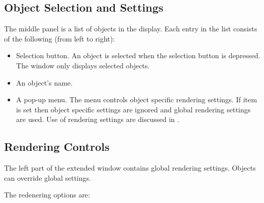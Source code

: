 \subsection{Object Selection and Settings}

The middle panel is a list of objects in the display.  Each entry in
the list consists of the following (from left to right):

\begin{itemize}
\item Selection button.  An object is selected when the selection
  button is depressed.  The \viewer{} window only displays selected
  objects.
\item An object's name.
\item A  pop-up menu.  The  menu
  controls object specific rendering settings.  If item  is set then object specific settings are ignored
  and global rendering settings are used.  Use of rendering settings
  are discussed in .
\end{itemize}


\subsection{Rendering Controls}
\label{sec:view-rendering} 

The left part of the extended \viewer{} window contains global
rendering settings.  Objects can override global settings.

The redenering options are:

